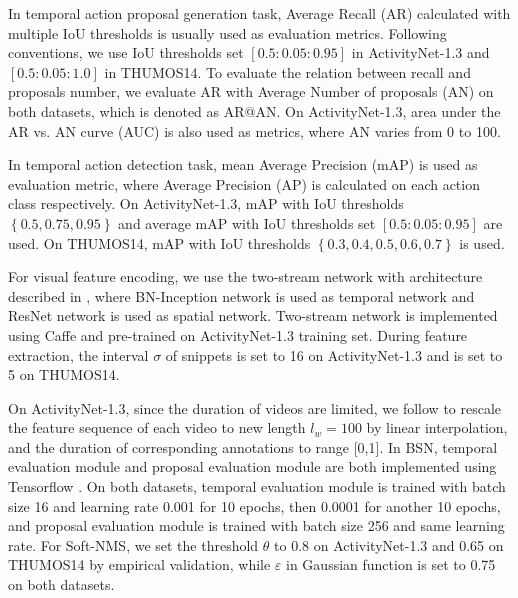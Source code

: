 \documentclass[runningheads]{llncs}
\begin{document}
In temporal action proposal generation task, Average Recall (AR) calculated with multiple IoU thresholds is usually used as evaluation metrics. Following  conventions, we use IoU thresholds set $[0.5:0.05:0.95]$ in ActivityNet-1.3 and $[0.5:0.05:1.0]$ in THUMOS14.
To evaluate the relation between recall and proposals number,  we evaluate AR with Average Number of proposals (AN) on both datasets, which is denoted as  AR@AN.
On ActivityNet-1.3, area under the AR vs. AN curve (AUC) is also used as metrics, where AN varies from 0 to 100.

In temporal action detection task, mean Average Precision (mAP) is used as evaluation metric, where Average Precision (AP) is calculated on each action class respectively. On ActivityNet-1.3, mAP with IoU thresholds $\left \{0.5,0.75,0.95\right \}$ and average mAP with IoU thresholds set $[0.5:0.05:0.95]$ are used. On THUMOS14, mAP with IoU thresholds $\left \{0.3,0.4,0.5,0.6,0.7 \right \}$ is used.



For visual feature encoding, we use the two-stream network \cite{simonyan2014two} with architecture described in \cite{xiong2016cuhk}, where BN-Inception network \cite{ioffe2015batch} is used as temporal network and ResNet network \cite{he2016deep} is used as spatial network. Two-stream network is implemented  using Caffe \cite{jia2014caffe} and pre-trained on ActivityNet-1.3 training set. During feature extraction,  the interval $\sigma $ of snippets is set to 16 on ActivityNet-1.3 and is set to 5 on THUMOS14.

On ActivityNet-1.3, since the duration of videos are limited, we follow \cite{lin2017temporal} to rescale the feature sequence of each video to new length $l_w =100$ by linear interpolation, and the duration of corresponding annotations to range [0,1].
In BSN, temporal evaluation module and proposal evaluation module are both implemented using Tensorflow \cite{abadi2016tensorflow}. On both datasets, temporal evaluation module is trained with batch size 16 and learning rate 0.001 for 10 epochs, then 0.0001 for another 10 epochs, and proposal evaluation module is trained with batch size 256 and same learning rate. %
For Soft-NMS, we set the threshold $\theta$ to 0.8 on ActivityNet-1.3 and 0.65 on THUMOS14 by empirical validation, while $\varepsilon $ in Gaussian function is set to 0.75 on both datasets.
\end{document}
